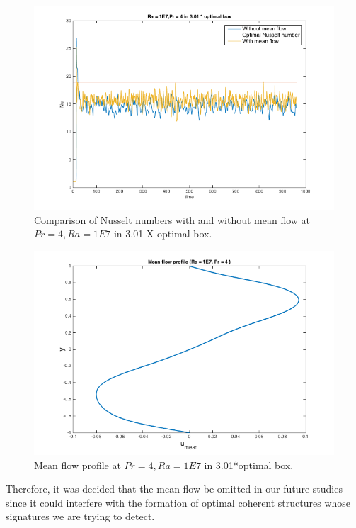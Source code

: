 \documentclass[12pt]{article}
\begin{document}
     \begin{figure}[!htb]
     	\includegraphics[width=\linewidth]{Nu1E74301opt.png}
     	\caption{Comparison of Nusselt numbers with and without mean flow at $Pr = 4, Ra = 1E7$ in 3.01 X optimal box.}
     	\label{fig:fig1}
     \end{figure}
     
     \begin{figure}[!htb]
     	\includegraphics[width=\linewidth]{umean.png}
     	\caption{Mean flow profile at $Pr = 4, Ra = 1E7$ in 3.01*optimal box.}
     	\label{fig:fig1}
     \end{figure}
     
     Therefore, it was decided that the mean flow be omitted in our future studies since it could interfere with the formation of optimal coherent structures whose signatures we are trying to detect.
     
\end{document}
